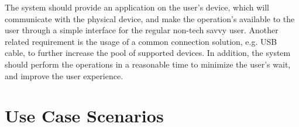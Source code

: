 The system should provide an application on the user's device, which will communicate with the physical device, and make the operation's available to the user through a simple interface for the regular non-tech savvy user.
Another related requirement is the usage of a common connection solution, e.g. USB cable, to further increase the pool of supported devices.
In addition, the system should perform the operations in a reasonable time to minimize the user's wait, and improve the user experience.
%
%
%

\section{Use Case Scenarios}\label{chap:problem:scenarios}

